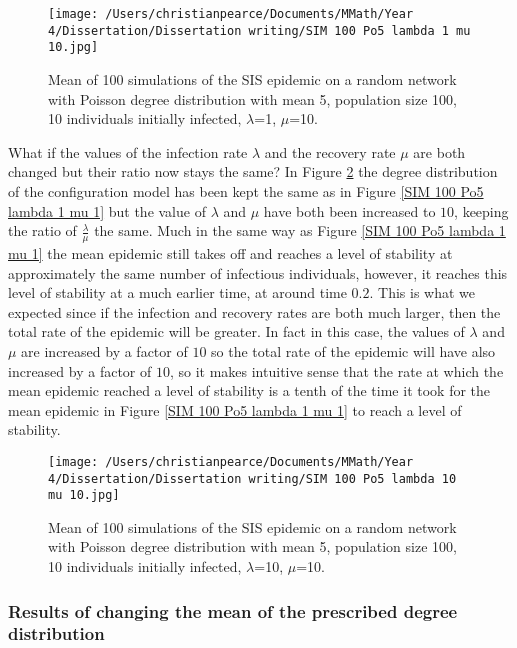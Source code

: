 \documentclass{uonmathsreport}
\begin{document}
\begin{figure}
\begin{center}
\texttt{[image: /Users/christianpearce/Documents/MMath/Year 4/Dissertation/Dissertation writing/SIM 100 Po5 lambda 1 mu 10.jpg]}
\end{center}
\caption{Mean of 100 simulations of the SIS epidemic on a random network with Poisson degree distribution with mean 5, population size 100, 10 individuals initially infected, $\lambda$=1, $\mu$=10.}
\label{SIM 100 Po5 lambda 1 mu 10}
\end{figure}

What if the values of the infection rate $\lambda$ and the recovery rate $\mu$ are both changed but their ratio now stays the same? In Figure \ref{SIM 100 Po5 lambda 10 mu 10} the degree distribution of the configuration model has been kept the same as in Figure \ref{SIM 100 Po5 lambda 1 mu 1} but the value of $\lambda$ and $\mu$ have both been increased to $10$, keeping the ratio of $\frac{\lambda}{\mu}$ the same. Much in the same way as Figure \ref{SIM 100 Po5 lambda 1 mu 1} the mean epidemic still takes off and reaches a level of stability at approximately the same number of infectious individuals, however, it reaches this level of stability at a much earlier time, at around time $0.2$. This is what we expected since if the infection and recovery rates are both much larger, then the total rate of the epidemic will be greater. In fact in this case, the values of $\lambda$ and $\mu$ are increased by a factor of $10$ so the total rate of the epidemic will have also increased by a factor of $10$, so it makes intuitive sense that the rate at which the mean epidemic reached a level of stability is a tenth of the time it took for the mean epidemic in Figure \ref{SIM 100 Po5 lambda 1 mu 1} to reach a level of stability.

\begin{figure}
\begin{center}
\texttt{[image: /Users/christianpearce/Documents/MMath/Year 4/Dissertation/Dissertation writing/SIM 100 Po5 lambda 10 mu 10.jpg]}
\end{center}
\caption{Mean of 100 simulations of the SIS epidemic on a random network with Poisson degree distribution with mean 5, population size 100, 10 individuals initially infected, $\lambda$=10, $\mu$=10.}
\label{SIM 100 Po5 lambda 10 mu 10}
\end{figure}

\subsubsection{Results of changing the mean of the prescribed degree distribution} \label{subsub:5.5.3}
\end{document}
